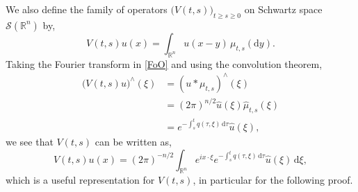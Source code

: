 \documentclass[a4paper, 12pt]{report}
\theoremstyle{cor}
\theoremstyle{remark}
\theoremstyle{definition}
\begin{document}
We also define the family of operators $\big(V(t, s)\big)_{t \ge s \ge 0}$ on Schwartz space $\mathcal{S}(\mathbb{R}^n)$ by,
\begin{equation}\label{FoO}
V(t, s)u(x) = \int_{\mathbb{R}^n}u(x - y)\,\mu_{t, s}(\mathrm{d}y).
\end{equation}
Taking the Fourier transform in \eqref{FoO} and using the convolution theorem,
\begin{align}
\big(V(t, s)u\big)^\wedge(\xi) & = (u\ast\mu_{t, s})^\wedge(\xi)\nonumber\\
& = (2\pi)^{n/2}\hat{u}(\xi)\hat{\mu}_{t, s}(\xi)\nonumber\\
& = e^{-\int_s^tq(\tau, \xi)\,\mathrm{d}\tau}\hat{u}(\xi)\nonumber,
\end{align}
we see that $V(t, s)$ can be written as,
\begin{equation}\label{Op}
V(t, s)u(x) = (2\pi)^{-n/2}\int_{\mathbb{R}^n}e^{ix\cdot\xi}e^{-\int_s^tq(\tau, \xi)\,\mathrm{d}\tau}\hat{u}(\xi)\,\mathrm{d}\xi,
\end{equation}
which is a useful representation for $V(t, s)$, in particular for the following proof.
\end{document}
